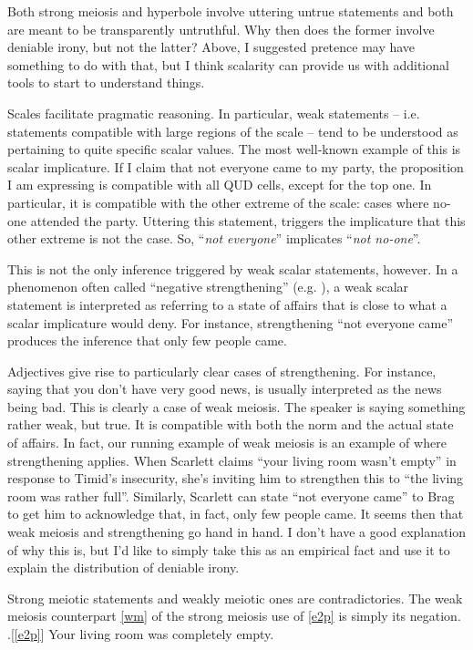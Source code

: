 \documentclass[a4paper,12pt,twoside]{article}
\begin{document}
Both strong meiosis and hyperbole involve uttering untrue statements and both are meant to be transparently untruthful. Why then does the former involve deniable irony, but not the latter? Above, I suggested pretence may have something to do with that, but I think scalarity can provide us with additional tools to start to understand things.

Scales facilitate pragmatic reasoning. In particular, weak statements -- i.e. statements compatible with large regions of the scale -- tend to be understood as pertaining to quite specific scalar values. The most well-known example of this is scalar implicature. If I claim that not everyone came to my party, the proposition I am expressing is compatible with all QUD cells, except for the top one. In particular, it is compatible with the other extreme of the scale: cases where no-one attended the party. Uttering this statement, triggers the implicature that this other extreme is not the case. So, ``\emph{not everyone}'' implicates ``\emph{not no-one}''.

This is not the only inference triggered by weak scalar statements, however. In a phenomenon often called ``negative strengthening'' (e.g. \citealt{horn:89}), a weak scalar statement is interpreted as referring to a state of affairs that is close to what a scalar implicature would deny. For instance, strengthening ``not everyone came'' produces the inference that only few people came. 

Adjectives give rise to particularly clear cases of strengthening. For instance, saying that you don't have very good news, is usually interpreted as the news being bad. This is clearly a case of weak meiosis. The speaker is saying something rather weak, but true. It is compatible with both the norm and the actual state of affairs. In fact, our running example of weak meiosis is an example of where strengthening applies. When Scarlett claims ``your living room wasn't empty'' in response to Timid's insecurity, she's inviting him to strengthen this to ``the living room was rather full''. Similarly, Scarlett can state ``not everyone came'' to Brag to get him to acknowledge that, in fact, only few people came.
It seems then that weak meiosis and strengthening go hand in hand. I don't have a good explanation of why this is, but I'd like to simply take this as an empirical fact and use it to explain the distribution of deniable irony.

Strong meiotic statements and weakly meiotic ones are contradictories. The weak meiosis counterpart \ref{wm} of the strong meiosis use of \ref{e2p} is simply its negation.
\ex.[\ref{e2p}] Your living room was completely empty.
\end{document}
